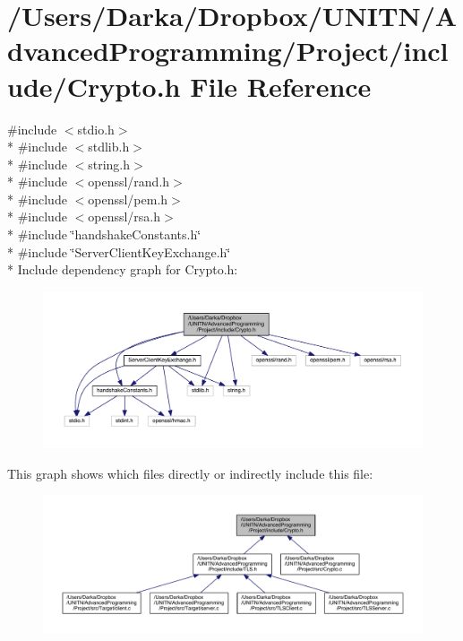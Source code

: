 \section{/\+Users/\+Darka/\+Dropbox/\+U\+N\+I\+T\+N/\+Advanced\+Programming/\+Project/include/\+Crypto.h File Reference}
\label{_crypto_8h}
{\ttfamily \#include $<$stdio.\+h$>$}\\*
{\ttfamily \#include $<$stdlib.\+h$>$}\\*
{\ttfamily \#include $<$string.\+h$>$}\\*
{\ttfamily \#include $<$openssl/rand.\+h$>$}\\*
{\ttfamily \#include $<$openssl/pem.\+h$>$}\\*
{\ttfamily \#include $<$openssl/rsa.\+h$>$}\\*
{\ttfamily \#include \char`\"{}handshake\+Constants.\+h\char`\"{}}\\*
{\ttfamily \#include \char`\"{}Server\+Client\+Key\+Exchange.\+h\char`\"{}}\\*
Include dependency graph for Crypto.\+h\+:\nopagebreak
\begin{figure}[H]
\begin{center}
\leavevmode
\includegraphics[width=350pt]{_crypto_8h__incl}
\end{center}
\end{figure}
This graph shows which files directly or indirectly include this file\+:\nopagebreak
\begin{figure}[H]
\begin{center}
\leavevmode
\includegraphics[width=350pt]{_crypto_8h__dep__incl}
\end{center}
\end{figure}

